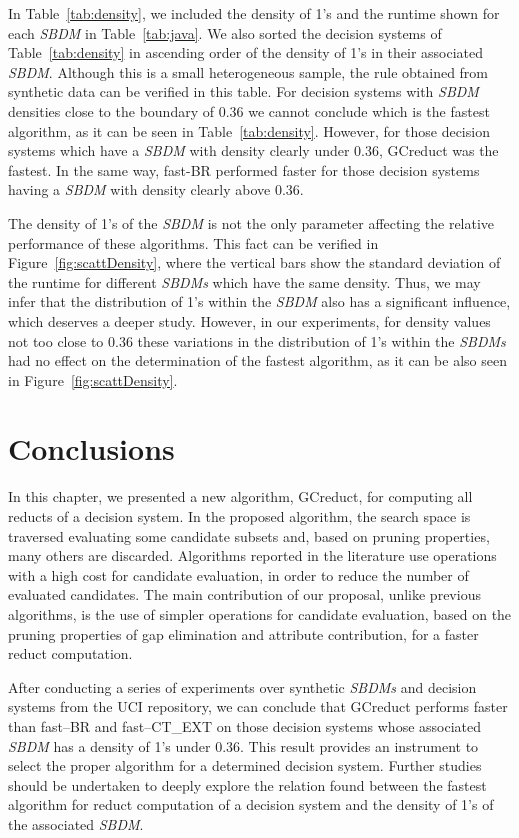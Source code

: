 \documentclass[letterpaper, twoside, openright, 12pt]{book}%
\begin{document}
	In Table~\ref{tab:density}, we included the density of 1's and the runtime shown for each \textit{SBDM} in Table~\ref{tab:java}. We also sorted the decision systems of Table~\ref{tab:density} in ascending order of the density of 1's in their associated \textit{SBDM}. Although this is a small heterogeneous sample, the rule obtained from synthetic data can be verified in this table. For decision systems with \textit{SBDM} densities close to the boundary of 0.36 we cannot conclude which is the fastest algorithm, as it can be seen in Table~\ref{tab:density}. However, for those decision systems which have a \textit{SBDM} with density clearly under 0.36, GCreduct was the fastest. In the same way, fast-BR performed faster for those decision systems having a \textit{SBDM} with density clearly above 0.36.
	
	The density of 1's of the \textit{SBDM} is not the only parameter affecting the relative performance of these algorithms. This fact can be verified in Figure~\ref{fig:scattDensity}, where the vertical bars show the standard deviation of the runtime for different \textit{SBDMs} which have the same density. Thus, we may infer that the distribution of 1's within the \textit{SBDM} also has a significant influence, which deserves a deeper study. However, in our experiments, for density values not too close to 0.36 these variations in the distribution of 1's within the \textit{SBDMs} had no effect on the determination of the fastest algorithm, as it can be also seen in Figure~\ref{fig:scattDensity}.
%	
\section{Conclusions}\label{GC_conclusions}
%
	In this chapter, we presented a new algorithm, GCreduct, for computing all reducts of a decision system. In the proposed algorithm, the search space is traversed evaluating some candidate subsets and, based on pruning properties, many others are discarded. Algorithms reported in the literature use operations with a high cost for candidate evaluation, in order to reduce the number of evaluated candidates. The main contribution of our proposal, unlike previous algorithms, is the use of simpler operations for candidate evaluation, based on the pruning properties of gap elimination and attribute contribution, for a faster reduct computation. 
	
	After conducting a series of experiments over synthetic \textit{SBDMs} and decision systems from the UCI repository, we can conclude that GCreduct performs faster than fast--BR and fast--CT\_EXT on those decision systems whose associated \textit{SBDM} has a density of 1's under 0.36. This result provides an instrument to select the proper algorithm for a determined decision system. Further studies should be undertaken to deeply explore the relation found between the fastest algorithm for reduct computation of a decision system and the density of 1's of the associated \textit{SBDM}. 
	
\end{document}
